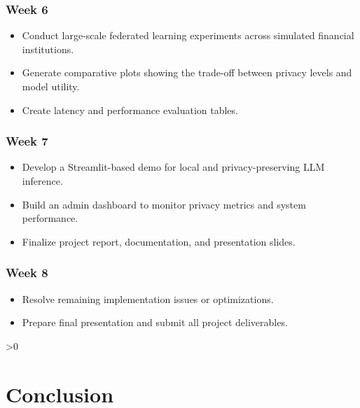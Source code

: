 \documentclass[12pt,a4paper]{report}
\let\oldchapter\chapter
\renewcommand{\chapter}{\ifnum\value{chapter}>0 \clearpage\pagestyle{fancy}\fi\oldchapter}
\begin{document}
\subsection*{Week 6}
\begin{itemize}
    \item Conduct large-scale federated learning experiments across simulated financial institutions.
    \item Generate comparative plots showing the trade-off between privacy levels and model utility.
    \item Create latency and performance evaluation tables.
\end{itemize}

\subsection*{Week 7}
\begin{itemize}
    \item Develop a Streamlit-based demo for local and privacy-preserving LLM inference.
    \item Build an admin dashboard to monitor privacy metrics and system performance.
    \item Finalize project report, documentation, and presentation slides.
\end{itemize}

\subsection*{Week 8}
\begin{itemize}
    \item Resolve remaining implementation issues or optimizations.
    \item Prepare final presentation and submit all project deliverables.
\end{itemize}



\chapter{Conclusion}
\end{document}
